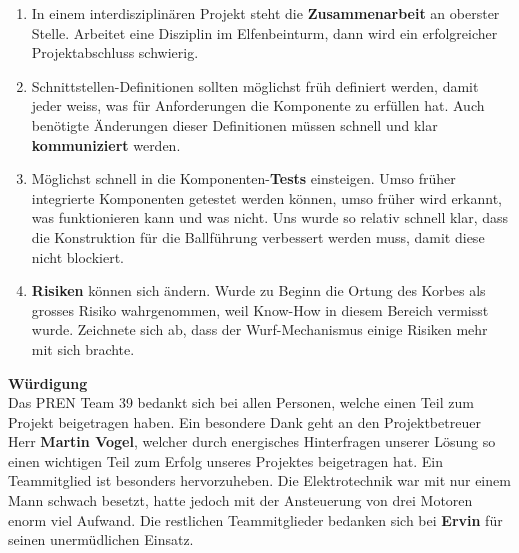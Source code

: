 \begin{enumerate}
	\item  In einem interdisziplinären Projekt steht die \textbf{Zusammenarbeit} an oberster Stelle. Arbeitet eine Disziplin im Elfenbeinturm, dann wird ein erfolgreicher Projektabschluss schwierig.
	\item Schnittstellen-Definitionen sollten möglichst früh definiert werden, damit jeder weiss, was für Anforderungen die Komponente zu erfüllen hat. Auch benötigte Änderungen dieser Definitionen müssen schnell und klar \textbf{kommuniziert} werden.
	\item Möglichst schnell in die Komponenten-\textbf{Tests} einsteigen. Umso früher integrierte Komponenten getestet werden können, umso früher wird erkannt, was funktionieren kann und was nicht. Uns wurde so relativ schnell klar, dass die Konstruktion für die Ballführung verbessert werden muss, damit diese nicht blockiert.
	\item \textbf{Risiken} können sich ändern. Wurde zu Beginn die Ortung des Korbes als grosses Risiko wahrgenommen, weil Know-How in diesem Bereich vermisst wurde. Zeichnete sich ab, dass der Wurf-Mechanismus einige Risiken mehr mit sich brachte.
\end{enumerate}

\noindent
\textbf{Würdigung}
\\
Das PREN Team 39 bedankt sich bei allen Personen, welche einen Teil zum Projekt beigetragen haben. Ein besondere Dank geht an den Projektbetreuer Herr \textbf{Martin Vogel}, welcher durch energisches Hinterfragen unserer Lösung so einen wichtigen Teil zum Erfolg unseres Projektes beigetragen hat. Ein Teammitglied ist besonders hervorzuheben. Die Elektrotechnik war mit nur einem Mann schwach besetzt, hatte jedoch mit der Ansteuerung von drei Motoren enorm viel Aufwand. Die restlichen Teammitglieder bedanken sich bei \textbf{Ervin} für seinen unermüdlichen Einsatz.